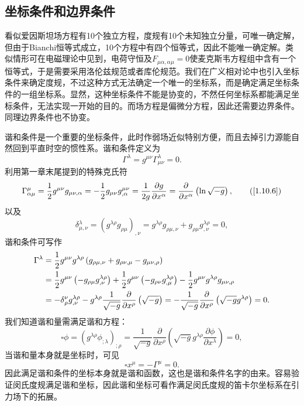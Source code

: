 \documentclass[11pt, a4paper, oneside, onecolumn]{ctexart}
\numberwithin{equation}{subsection}
\begin{document}
\subsection{坐标条件和边界条件}
看似爱因斯坦场方程有10个独立方程，度规有10个未知独立分量，可唯一确定解，但由于Bianchi恒等式成立，10个方程中有四个恒等式，因此不能唯一确定解。类似情形可在电磁理论中见到，电荷守恒及$F_{\mu\alpha,\alpha\mu}=0$使麦克斯韦方程组中含有一个恒等式，于是需要采用洛伦兹规范或者库伦规范。我们在广义相对论中也引入坐标条件来确定度规，不过这种方式无法确定一个唯一的坐标系，而是确定满足坐标条件的一组坐标系。显然，这种坐标条件不能是协变的，不然任何坐标系都能满足坐标条件，无法实现一开始的目的。而场方程是偏微分方程，因此还需要边界条件。同理边界条件也不协变。

谐和条件是一个重要的坐标条件，此时作弱场近似特别方便，而且去掉引力源能自然回到平直时空的惯性系。谐和条件定义为
\begin{equation}
\Gamma^{\lambda}=g^{\mu\nu}\Gamma_{\mu\nu}^{\lambda}=0.
\end{equation}
利用第一章末尾提到的特殊克氏符
\begin{equation}
\Gamma_{\alpha\mu}^{\mu}=\frac12g^{\mu\nu}g_{\mu\nu,\alpha}=-\frac{1}{2}g_{\mu\nu}g^{\mu\nu}_{,\alpha}=\frac{1}{2g}\frac{\partial{}g}{\partial{}x^{\alpha}}=\frac{\partial{}}{\partial{}x^{\alpha}}\left(\ln\sqrt{-g}\right),\tag{\ref{1.10.6}}
\end{equation}
以及
\begin{equation}
\delta{}^{\lambda}_{\mu,\nu}=\left(g^{\lambda\rho}g_{\rho\mu}\right)_{,\nu}=g^{\lambda\rho}g_{\rho\mu,\nu}+g_{\rho\mu}g^{\lambda\rho}_{,\nu}=0,
\end{equation}
谐和条件可写作
\begin{align}
\Gamma^{\lambda}&=\frac{1}{2}g^{\mu\nu}g^{\lambda\rho}\left(g_{\rho\mu,\nu}+g_{\rho\nu,\mu}-g_{\mu\nu,\rho}\right)\notag\\
&=\frac{1}{2}g^{\mu\nu}\left(-g_{\rho\mu}g^{\lambda\rho}_{,\nu}\right)+\frac{1}{2}g^{\mu\nu}\left(-g_{\rho\nu}g^{\lambda\rho}_{,\mu}\right)-\frac{1}{2}g^{\mu\nu}g^{\lambda\rho}g_{\mu\nu,\rho}\notag\\
&=-\delta{}^{\nu}_{\rho}g^{\lambda\rho}_{,\nu}-g^{\lambda\rho}\frac{1}{\sqrt{-g}}\frac{\partial{}}{\partial{}x^{\rho}}\left(\sqrt{-g}\right)=-\frac{1}{\sqrt{-g}}\frac{\partial{}}{\partial{}x^{\rho}}\left(\sqrt{-g}g^{\lambda\rho}\right)=0.
\end{align}
我们知道谐和量需满足谐和方程：
\begin{equation}
\square\phi=\left(g^{\lambda\rho}\phi_{;\lambda}\right)_{;\rho}=\frac{1}{\sqrt{-g}}\frac{\partial{}}{\partial{}x^{\rho}}\left(\sqrt{-g}g^{\lambda\rho}\frac{\partial{}\phi}{\partial{}x^{\lambda}}\right)=0,
\end{equation}
当谐和量本身就是坐标时，可见
\begin{equation}
\square x^{\mu}=-\Gamma^{\mu}=0.
\end{equation}
因此满足谐和条件的坐标本身就是谐和函数，这也是谐和条件名字的由来。容易验证闵氏度规满足谐和坐标，因此谐和坐标可看作满足闵氏度规的笛卡尔坐标系在引力场下的拓展。
\end{document}
